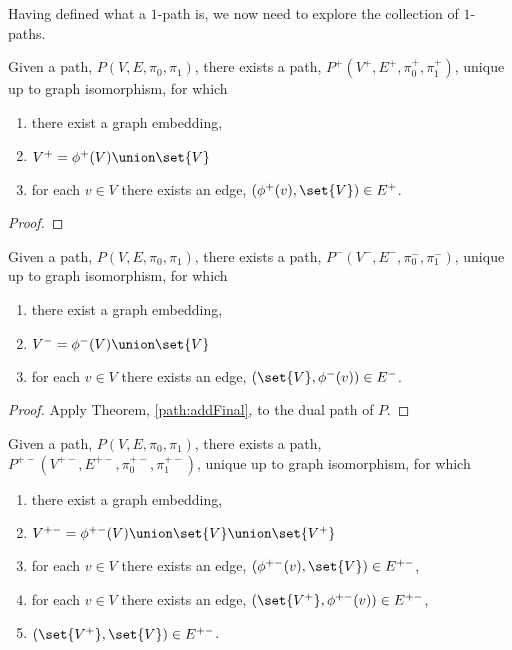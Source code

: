 \documentclass[a4paper]{amsart}
\begin{document}
Having defined what a $1$-path is, we now need to explore the collection of $1$-paths.

\begin{theorem}\label{path:addFinal}
Given a path, $P(V, E, \pi_0, \pi_1)$, there exists a path, $P^+(V^+, E^+, \pi^+_0,
\pi^+_1)$,  unique up to graph isomorphism, for which
\begin{enumerate}
\item there exist a graph embedding, 
\item $V^+ = \phi^+(V) \union \set{V}$
\item for each $v \in V$ there exists an edge, $(\phi^+(v), \set{V}) \in E^+$.
\end{enumerate}
\end{theorem}

\begin{proof}
\end{proof}

\begin{corollary}\label{path:addInitial}
Given a path, $P(V, E, \pi_0, \pi_1)$, there exists a path, $P^-(V^-, E^-, \pi^-_0,
\pi^-_1)$,  unique up to graph isomorphism, for which
\begin{enumerate}
\item there exist a graph embedding, 
\item $V^- = \phi^-(V) \union \set{V}$
\item for each $v \in V$ there exists an edge, $(\set{V}, \phi^-(v)) \in E^-$.
\end{enumerate}
\end{corollary}

\begin{proof}
Apply Theorem, \ref{path:addFinal}, to the dual path of $P$.
\end{proof}

\begin{corollary}
Given a path, $P(V, E, \pi_0, \pi_1)$, there exists a path, $P^{+-}(V^{+-}, E^{+-},
\pi^{+-}_0, \pi^{+-}_1)$,  unique up to graph isomorphism, for which
\begin{enumerate}
\item there exist a graph embedding, 
\item $V^{+-} = \phi^{+-}(V) \union \set{V} \union \set{V^+}$
\item for each $v \in V$ there exists an edge, $(\phi^{+-}(v), \set{V}) \in E^{+-}$,
\item for each $v \in V$ there exists an edge, $(\set{V^+}, \phi^{+-}(v)) \in E^{+-}$,
\item $(\set{V^+}, \set{V}) \in E^{+-}$.
\end{enumerate}
\end{corollary}
\end{document}

